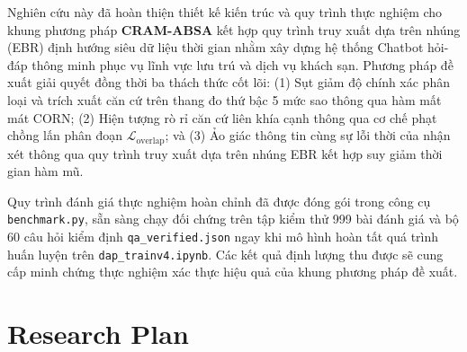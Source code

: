 \documentclass[pdflatex,sn-mathphys-num]{sn-jnl}
\theoremstyle{thmstyleone}
\theoremstyle{thmstyletwo}
\theoremstyle{thmstylethree}
\begin{document}
Nghiên cứu này đã hoàn thiện thiết kế kiến trúc và quy trình thực nghiệm cho khung phương pháp \textbf{CRAM-ABSA} kết hợp quy trình truy xuất dựa trên nhúng (EBR) định hướng siêu dữ liệu thời gian nhằm xây dựng hệ thống Chatbot hỏi-đáp thông minh phục vụ lĩnh vực lưu trú và dịch vụ khách sạn. Phương pháp đề xuất giải quyết đồng thời ba thách thức cốt lõi: (1) Sụt giảm độ chính xác phân loại và trích xuất căn cứ trên thang đo thứ bậc 5 mức sao thông qua hàm mất mát CORN; (2) Hiện tượng rò rỉ căn cứ liên khía cạnh thông qua cơ chế phạt chồng lấn phân đoạn $\mathcal{L}_{\text{overlap}}$; và (3) Ảo giác thông tin cùng sự lỗi thời của nhận xét thông qua quy trình truy xuất dựa trên nhúng EBR kết hợp suy giảm thời gian hàm mũ.

Quy trình đánh giá thực nghiệm hoàn chỉnh đã được đóng gói trong công cụ \texttt{benchmark.py}, sẵn sàng chạy đối chứng trên tập kiểm thử 999 bài đánh giá và bộ 60 câu hỏi kiểm định \texttt{qa\_verified.json} ngay khi mô hình hoàn tất quá trình huấn luyện trên \texttt{dap\_trainv4.ipynb}. Các kết quả định lượng thu được sẽ cung cấp minh chứng thực nghiệm xác thực hiệu quả của khung phương pháp đề xuất.

\section{Research Plan}
\label{sec:plan}
\end{document}
